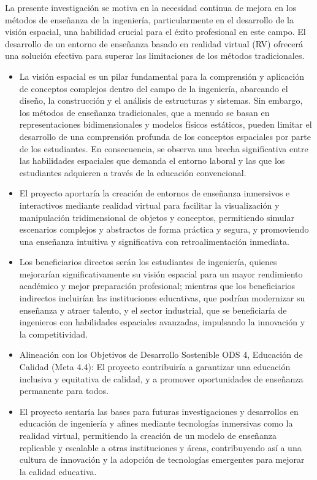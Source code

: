 La presente investigación se motiva en la necesidad continua de mejora en los métodos de enseñanza de la ingeniería, particularmente en el desarrollo de la visión espacial, una habilidad crucial para el éxito profesional en este campo. El desarrollo de un entorno de enseñanza basado en realidad virtual (RV) ofrecerá una solución efectiva para superar las limitaciones de los métodos tradicionales.

\begin{itemize}
  \item La visión espacial es un pilar fundamental para la comprensión y aplicación de conceptos complejos dentro del campo de la ingeniería, abarcando el diseño, la construcción y el análisis de estructuras y sistemas. Sin embargo, los métodos de enseñanza tradicionales, que a menudo se basan en representaciones bidimensionales y modelos físicos estáticos, pueden limitar el desarrollo de una comprensión profunda de los conceptos espaciales por parte de los estudiantes. En consecuencia, se observa una brecha significativa entre las habilidades espaciales que demanda el entorno laboral y las que los estudiantes adquieren a través de la educación convencional.
  \item El proyecto aportaría la creación de entornos de enseñanza inmersivos e interactivos mediante realidad virtual para facilitar la visualización y manipulación tridimensional de objetos y conceptos, permitiendo simular escenarios complejos y abstractos de forma práctica y segura, y promoviendo una enseñanza intuitiva y significativa con retroalimentación inmediata.
  \item Los beneficiarios directos serán los estudiantes de ingeniería, quienes mejorarían significativamente su visión espacial para un mayor rendimiento académico y mejor preparación profesional; mientras que los beneficiarios indirectos incluirían las instituciones educativas, que podrían modernizar su enseñanza y atraer talento, y el sector industrial, que se beneficiaría de ingenieros con habilidades espaciales avanzadas, impulsando la innovación y la competitividad.
  \item Alineación con los Objetivos de Desarrollo Sostenible ODS 4, Educación de Calidad (Meta 4.4): El proyecto contribuiría a garantizar una educación inclusiva y equitativa de calidad, y a promover oportunidades de enseñanza permanente para todos.
  \item El proyecto sentaría las bases para futuras investigaciones y desarrollos en educación de ingeniería y afines mediante tecnologías inmersivas como la realidad virtual, permitiendo la creación de un modelo de enseñanza replicable y escalable a otras instituciones y áreas, contribuyendo así a una cultura de innovación y la adopción de tecnologías emergentes para mejorar la calidad educativa.
\end{itemize}

\clearpage
